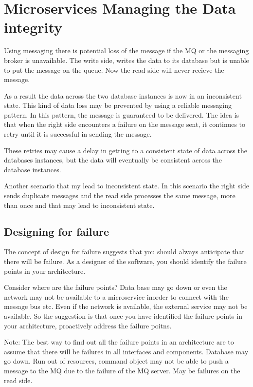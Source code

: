 \chapter{Microservices Managing the Data integrity}
Using messaging there is potential loss of the message if the MQ or the messaging broker is unavailable.
The write side, writes the data to its database but is unable to put the message on the queue.
Now the read side will never recieve the message.

As a result the data across the two database instances is now in an inconsistent state.
This kind of data loss may be prevented by using a reliable messaging pattern.
In this pattern, the message is guaranteed to be delivered.
The idea is that when the right side encounters a failure on the message sent, it continues to retry until it is successful in sending the message.

These retries may cause a delay in getting to a consistent state of data across the databases instances, but the data will eventually be consistent across the database instances.

Another scenario that my lead to inconsistent state.
In this scenario the right side sends duplicate messages and the read side processes the same message, more than once and that may lead to inconsistent state.

\section{Designing for failure}
The concept of design for failure suggests that you should always anticipate that there will be failure.
As a designer of the software, you should identify the failure points in your architecture.

Consider where are the failure points?
Data base may go down or even the network may not be available to a microservice inorder to connect with the message bus etc.
Even if the network is available, the external service may not be available.
So the suggestion is that once you have identified the failure points in your architecture, proactively address the failure poitns.

Note:
The best way to find out all the failure points in an architecture are to assume that there will be failures in all interfaces and components.
Database may go down. Run out of resources, command object may not be able to push a message to the MQ due to the failure of the MQ server.
May be failures on the read side.

